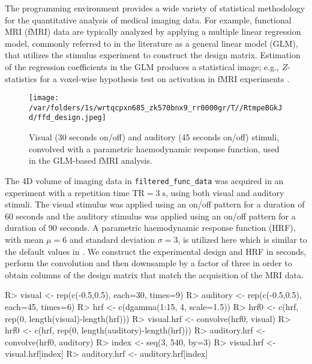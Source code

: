 \documentclass[
]{jss}
\begin{document}
The  programming environment provides a wide variety of
statistical methodology for the quantitative analysis of medical imaging
data. For example, functional MRI (fMRI) data are typically analyzed by
applying a multiple linear regression model, commonly referred to in the
literature as a general linear model (GLM), that utilizes the stimulus
experiment to construct the design matrix. Estimation of the regression
coefficients in the GLM produces a statistical image; e.g.,
\(Z\)-statistics for a voxel-wise hypothesis test on activation in fMRI
experiments \citep{fri-etal:spms,fri-etal:revisited}.

\begin{figure}[tbp]
  \begin{center}
    \texttt{[image: /var/folders/1s/wrtqcpxn685\_zk570bnx9\_rr0000gr/T//RtmpeBGkJd/ffd\_design.jpeg]}
    \end{center}
  \caption{Visual (30 seconds on/off) and auditory (45 seconds on/off)
    stimuli, convolved with a parametric haemodynamic response
    function, used in the GLM-based fMRI analysis.}
  \label{fig:ffd-design}
\end{figure}

The 4D volume of imaging data in \texttt{filtered\_func\_data} was
acquired in an experiment with a repetition time
\(\text{TR}=3\;\text{s}\), using both visual and auditory stimuli. The
visual stimulus was applied using an on/off pattern for a duration of 60
seconds and the auditory stimulus was applied using an on/off pattern
for a duration of 90 seconds. A parametric haemodynamic response
function (HRF), with mean \(\mu=6\) and standard deviation \(\sigma=3\),
is utilized here which is similar to the default values in 
\citep{smi-etal:FSL}. We construct the experimental design and HRF in
seconds, perform the convolution and then downsample by a factor of
three in order to obtain columns of the design matrix that match the
acquisition of the MRI data.

\begin{CodeChunk}

\begin{CodeInput}
R> visual <- rep(c(-0.5,0.5), each=30, times=9)
R> auditory <- rep(c(-0.5,0.5), each=45, times=6)
R> hrf <- c(dgamma(1:15, 4, scale=1.5))
R> hrf0 <- c(hrf, rep(0, length(visual)-length(hrf)))
R> visual.hrf <- convolve(hrf0, visual)
R> hrf0 <- c(hrf, rep(0, length(auditory)-length(hrf)))
R> auditory.hrf <- convolve(hrf0, auditory)
R> index <- seq(3, 540, by=3)
R> visual.hrf <- visual.hrf[index]
R> auditory.hrf <- auditory.hrf[index]
\end{CodeInput}
\end{CodeChunk}
\end{document}
